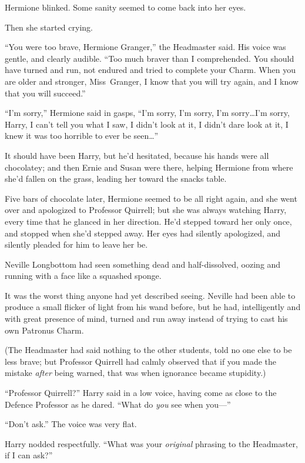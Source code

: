 Hermione blinked. Some sanity seemed to come back into her eyes.

Then she started crying.

“You were too brave, Hermione Granger,” the Headmaster said. His voice was gentle, and clearly audible. “Too much braver than I comprehended. You should have turned and run, not endured and tried to complete your Charm. When you are older and stronger, Miss~Granger, I know that you will try again, and I know that you will succeed.”

“I’m sorry,” Hermione said in gasps, “I’m sorry, I’m sorry, I’m sorry…I’m sorry, Harry, I can’t tell you what I saw, I didn’t look at it, I didn’t dare look at it, I knew it was too horrible to ever be seen…”

It should have been Harry, but he’d hesitated, because his hands were all chocolatey; and then Ernie and Susan were there, helping Hermione from where she’d fallen on the grass, leading her toward the snacks table.

Five bars of chocolate later, Hermione seemed to be all right again, and she went over and apologized to Professor Quirrell; but she was always watching Harry, every time that he glanced in her direction. He’d stepped toward her only once, and stopped when she’d stepped away. Her eyes had silently apologized, and silently pleaded for him to leave her be.

\later

Neville Longbottom had seen something dead and half-dissolved, oozing and running with a face like a squashed sponge.

It was the worst thing anyone had yet described seeing. Neville had been able to produce a small flicker of light from his wand before, but he had, intelligently and with great presence of mind, turned and run away instead of trying to cast his own Patronus Charm.

(The Headmaster had said nothing to the other students, told no one else to be less brave; but Professor Quirrell had calmly observed that if you made the mistake \emph{after} being warned, that was when ignorance became stupidity.)

“Professor Quirrell?” Harry said in a low voice, having come as close to the Defence Professor as he dared. “What do \emph{you} see when you—”

“Don’t ask.” The voice was very flat.

Harry nodded respectfully. “What was your \emph{original} phrasing to the Headmaster, if I can ask?”

